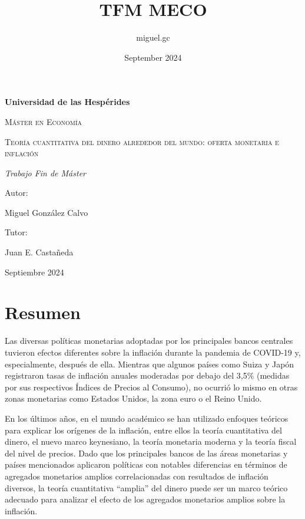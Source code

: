 \documentclass[titlepage, 12pt]{article}
\title{TFM MECO}
\author{miguel.gc }
\date{September 2024}
\begin{document}
\begin{titlepage}
    \centering
    {\bfseries\LARGE Universidad de las Hespérides \par}
    \vspace{1cm}
    {\scshape\Large Máster en Economía \par}
    \vspace{3cm}
    {\scshape\Huge Teoría cuantitativa del dinero alrededor del mundo: oferta monetaria e inflación \par}
    \vspace{3cm}
    {\itshape\Large Trabajo Fin de Máster \par}
    \vfill
    {\Large Autor: \par}
    {\Large Miguel González Calvo \par}
    \vspace{2cm}
    {\Large Tutor: \par}
    {\Large Juan E. Castañeda \par}
    \vfill
    {\Large Septiembre 2024 \par}

\end{titlepage}


\tableofcontents
\newpage
\listoffigures
\listoftables

\newpage
\section*{Resumen}
Las diversas políticas monetarias adoptadas por los principales bancos centrales tuvieron efectos diferentes sobre la inflación durante la pandemia de COVID-19 y, especialmente, después de ella. Mientras que algunos países como Suiza y Japón registraron tasas de inflación anuales moderadas por debajo del 3,5\% (medidas por sus respectivos Índices de Precios al Consumo), no ocurrió lo mismo en otras zonas monetarias como Estados Unidos, la zona euro o el Reino Unido.

En los últimos años, en el mundo académico se han utilizado enfoques teóricos para explicar los orígenes de la inflación, entre ellos la teoría cuantitativa del dinero, el nuevo marco keynesiano, la teoría monetaria moderna y la teoría fiscal del nivel de precios. Dado que los principales bancos de las áreas monetarias y países mencionados aplicaron políticas con notables diferencias en términos de agregados monetarios amplios correlacionadas con resultados de inflación diversos, la teoría cuantitativa \enquote{amplia} del dinero puede ser un marco teórico adecuado para analizar el efecto de los agregados monetarios amplios sobre la inflación.
\end{document}
